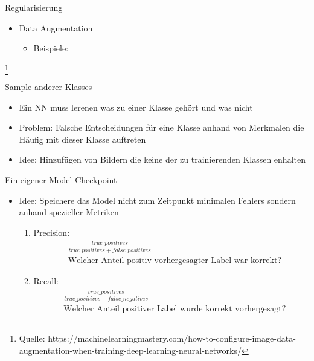 \begin{frame}{Regularisierung}
\begin{itemize}
\item Data Augmentation
\begin{itemize}
\item Beispiele:
\end{itemize}
\end{itemize}
\begin{figure}
%
\hspace{1cm}%
\caption{}
\end{figure}
\footnote{Quelle: https://machinelearningmastery.com/how-to-configure-image-data-augmentation-when-training-deep-learning-neural-networks/}
\end{frame}

\begin{frame}{Sample anderer Klasses}
\begin{itemize}
\item Ein NN muss lerenen was zu einer Klasse gehört und was nicht
\item Problem: Falsche Entscheidungen für eine Klasse anhand von Merkmalen die Häufig mit dieser Klasse auftreten
\item Idee: Hinzufügen von Bildern die keine der zu trainierenden Klassen enhalten
\end{itemize}
\end{frame}

\begin{frame}{Ein eigener Model Checkpoint}
\begin{itemize}
\item Idee: Speichere das Model nicht zum Zeitpunkt minimalen Fehlers sondern anhand spezieller Metriken
\begin{enumerate}
\item Precision: 
\begin{align*}
&\frac{true\_positives}{true\_positives + false\_positives}\\
&\text{Welcher Anteil positiv vorhergesagter Label war korrekt?}
\end{align*}
\item Recall:
\begin{align*}
&\frac{true\_positives}{true\_positives + false\_negatives}\\
&\text{Welcher Anteil positiver Label wurde korrekt vorhergesagt?}
\end{align*}
\end{enumerate}
\end{itemize}
\end{frame}


